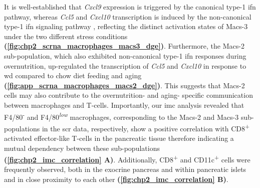 \par It is well-established that \textit{Cxcl9} expression is triggered by the canonical type-1 \gls{ifn} pathway, whereas \textit{Ccl5} and \textit{Cxcl10} transcription is induced by the non-canonical type-1 \gls{ifn} signaling pathway \textbf{\cite{mazewski_type_2020}}, reflecting the distinct activation states of Macs-3 under the two different stress conditions \textbf{(\autoref{fig:chp2_scrna_macrophages_macs3_dge})}. Furthermore, the Macs-2 sub-population, which also exhibited non-canonical type-1 \gls{ifn} responses during overnutrition, up-regulated the transcription of \textit{Ccl5} and \textit{Cxcl10} in response to \gls{wd} compared to chow diet feeding and aging \textbf{(\autoref{fig:app_scrna_macrophages_macs2_dge})}. This suggests that Macs-2 cells may also contribute to the overnutrition- and aging- specific communication between macrophages and T-cells. Importantly, our \gls{imc} analysis revealed that F4/80\textsuperscript{-} and F4/80\textsuperscript{\textit{low}} macrophages, corresponding to the Macs-2 and Macs-3 sub-populations in the \gls{scr} data, respectively, show a positive correlation with CD8\textsuperscript{+} activated effector-like T-cells in the pancreatic tissue therefore indicating a mutual dependency between these sub-populations \textbf{(\autoref{fig:chp2_imc_correlation} A)}. Additionally, CD8\textsuperscript{+} and CD11c\textsuperscript{+} cells were frequently observed, both in the exocrine pancreas and within pancreatic islets and in close proximity to each other \textbf{(\autoref{fig:chp2_imc_correlation} B)}.\\%



